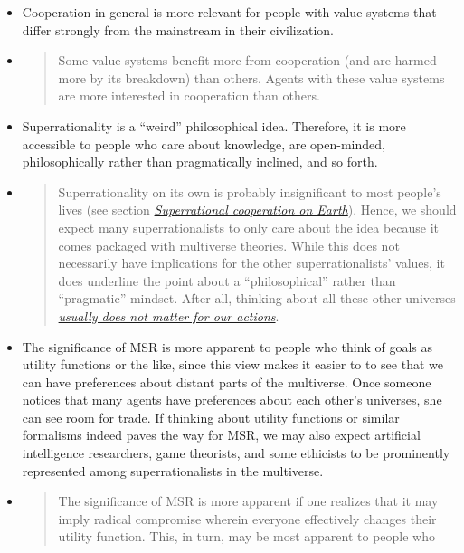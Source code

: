 \begin{itemize}
\item
  Cooperation in general is more relevant for people with value systems
  that differ strongly from the mainstream in their civilization.
\item
  \begin{quote}
  Some value systems benefit more from cooperation (and are harmed more
  by its breakdown) than others. Agents with these value systems are
  more interested in cooperation than others.
  \end{quote}
\item
  Superrationality is a ``weird'' philosophical idea. Therefore, it is
  more accessible to people who care about knowledge, are open-minded,
  philosophically rather than pragmatically inclined, and so forth.
\item
  \begin{quote}
  Superrationality on its own is probably insignificant to most people's
  lives (see section
  \protect\hyperlink{superrational-cooperation-on-earth}{\emph{Superrational
  cooperation on Earth}}). Hence, we should expect many
  superrationalists to only care about the idea because it comes
  packaged with multiverse theories. While this does not necessarily
  have implications for the other superrationalists' values, it does
  underline the point about a ``philosophical'' rather than
  ``pragmatic'' mindset. After all, thinking about all these other
  universes
  \href{http://lesswrong.com/lw/qz/living_in_many_worlds/}{\emph{usually
  does not matter for our actions}}.
  \end{quote}
\item
  The significance of MSR is more apparent to people who think of goals
  as utility functions or the like, since this view makes it easier to
  to see that we can have preferences about distant parts of the
  multiverse. Once someone notices that many agents have preferences
  about each other's universes, she can see room for trade. If thinking
  about utility functions or similar formalisms indeed paves the way for
  MSR, we may also expect artificial intelligence researchers, game
  theorists, and some ethicists to be prominently represented among
  superrationalists in the multiverse.
\item
  \begin{quote}
  The significance of MSR is more apparent if one realizes that it may
  imply radical compromise wherein everyone effectively changes their
  utility function. This, in turn, may be most apparent to people who

\end{quote}
\end{itemize}
